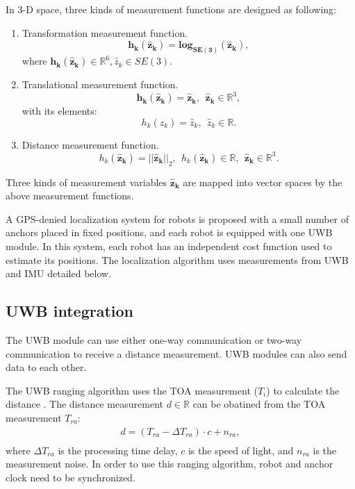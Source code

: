 \documentclass[journal]{IEEEtran}
\begin{document}
 In 3-D space, three kinds of measurement functions are designed as following:
\begin{enumerate}
\item Transformation measurement function.
		\begin{equation}\label{12}
		\mathbf {h_k(\hat{z}_{k}) = log_{SE(3)}(\hat{z}_{k})},
		\end{equation}
    		where $\mathbf{h_k(\hat{z}_{k})} \in \mathbb{R}^6, \hat{z}_{k} \in SE(3)$.
\item Translational measurement function.
	\begin{equation}\label{14}
	\mathbf {h_k(\hat{z}_{k}) = \hat{z}_{k}, \ \ \hat{z}_{k}} \in \mathbb{R}^3,
	\end{equation}
	with its elements:
	\begin{equation}\label{16}
	h_k(\hat{z}_{k}) =  \hat{z}_{k},\ \ \hat{z}_{k} \in \mathbb{R}.
	\end{equation}
\item
	Distance measurement function.
	\begin{equation}\label{15}
	h_k(\mathbf {\hat{z}_{k}}) = ||\mathbf {\hat{z}_{k}}||_2,\ \ h_k(\mathbf {\hat{z}_{k}}) \in \mathbb{R} ,\ \ \mathbf {\hat{z}_{k}} \in \mathbb{R}^3.
	\end{equation}
\end{enumerate}
Three kinds of measurement variables $\mathbf {\hat{z}_{k}}$ are mapped into vector spaces by the above measurement functions.

A GPS-denied localization system for robots is proposed with a small number of anchors placed in fixed positions, and each robot is equipped with one UWB module. In this system, each robot has an independent cost function used to estimate its positions. The localization algorithm uses measurements from UWB and IMU detailed below.

\subsection{UWB integration}
The UWB module can use either one-way communication or two-way communication to receive a distance measurement. UWB modules can also send data to each other.

The UWB ranging algorithm uses the TOA measurement ($T_i$) to calculate the distance \cite{Ledergerber:2015ur}. The distance measurement $d \in \mathbb{R}$ can be obatined from the TOA measurement $T_{ra}$:
\begin{equation}\label{25}
\begin{array}{c} 
d=(T_{ra}-\Delta T_{ra})\cdot c  + n_{ra}, \\
\end{array}
\end{equation}
where $\Delta T_{ra}$ is the processing time delay, $c$ is the speed of light, and $n_{ra}$ is the measurement noise. In order to use this ranging algorithm, robot and anchor clock need to be synchronized.
\end{document}
